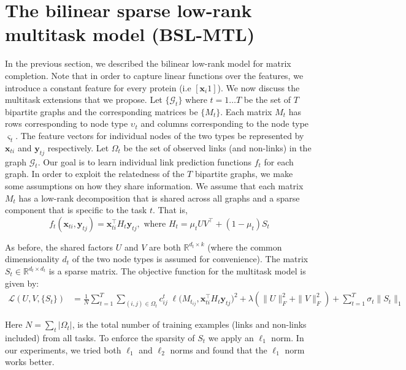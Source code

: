 \documentclass[runningheads,a4paper]{llncs}
\begin{document}
\section{The bilinear sparse low-rank multitask model (BSL-MTL)} 
\label{ourmodel}
In the previous section, we described the bilinear low-rank model for matrix completion. 
Note that in order to capture linear functions over the features, we introduce a constant feature for every protein 
(i.e $[\mathbf{x}_i 1]$). We now discuss the multitask extensions that we propose. Let $\{\mathcal{G}_t\}$ where $t=1 \ldots T$ be the set of $T$ bipartite graphs and the corresponding matrices be $\{M_t\}$. Each matrix $M_t$ has rows corresponding to node type $\upsilon_t$ and columns corresponding to the node type $\varsigma_t$. The feature vectors for individual nodes of the two types be represented by $\mathbf{x}_{ti}$ and $\mathbf{y}_{tj}$ respectively. Let $\Omega_t$ be the set of observed links (and non-links) in the graph $\mathcal{G}_t$. Our goal is to learn individual link prediction functions $f_t$ for each graph. In order to exploit the relatedness of the $T$ bipartite graphs, we make some assumptions on how they share information. We assume that each matrix $M_t$ has a low-rank decomposition that is shared across all graphs and a sparse component that is specific to the task $t$. That is,
\begin{equation}
f_t(\mathbf{x}_{ti}, \mathbf{y}_{tj}) = \mathbf{x}_{ti}^\intercal H_t \mathbf{y}_{tj}, \textrm{ where } H_t = \mu_t U V^\intercal + (1-\mu_t)  S_t
\end{equation}

As before, the shared factors $U$ and $V$ are both $\mathbb{R}^{d_t \times k}$ (where the common dimensionality $d_t$ of the two node types is assumed for convenience). The matrix $S_t \in \mathbb{R}^{d_t \times d_t}$ is a sparse matrix. The objective function for the multitask model is given by:
\begin{equation}
\label{mtl_objective}
\begin{array}{ll}
\mathcal{L}(U,V,\{S_t\}) & = \displaystyle{ \frac{1}{N} \sum_{t=1}^T \sum_{(i,j) \in \Omega_t}} c^t_{ij} \; \ell \big( M_{t_{ij}}, \mathbf{x}_{ti}^\intercal H_t \mathbf{y}_{tj} \big)^2 + \lambda ( \|U\|^2_F + \|V\|^2_F ) + \displaystyle{\sum_{t=1}^T \sigma_t \|S_t\|_1} 
\end{array}
\end{equation}

Here $N = \sum_t | \Omega_t |$, is the total number of training examples (links and non-links included) from all tasks. To enforce the sparsity of $S_t$ we apply an $\ell_1$ norm. In our experiments, we tried both $\ell_1$ and $\ell_2$ norms and found that the $\ell_1$ norm works better.
\end{document}
